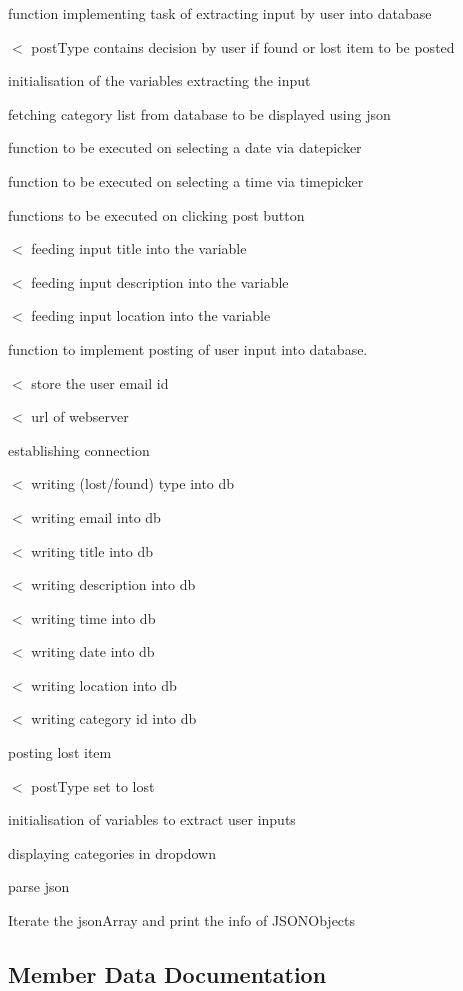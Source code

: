 function implementing task of extracting input by user into database 

$<$ post\+Type contains decision by user if found or lost item to be posted

initialisation of the variables extracting the input

fetching category list from database to be displayed using json

function to be executed on selecting a date via datepicker

function to be executed on selecting a time via timepicker

functions to be executed on clicking post button

$<$ feeding input title into the variable

$<$ feeding input description into the variable

$<$ feeding input location into the variable

function to implement posting of user input into database.

$<$ store the user email id

$<$ url of webserver

establishing connection

$<$ writing (lost/found) type into db

$<$ writing email into db

$<$ writing title into db

$<$ writing description into db

$<$ writing time into db

$<$ writing date into db

$<$ writing location into db

$<$ writing category id into db

posting lost item

$<$ post\+Type set to lost

initialisation of variables to extract user inputs

displaying categories in dropdown

parse json

Iterate the json\+Array and print the info of J\+S\+O\+N\+Objects 

\subsection{Member Data Documentation}
